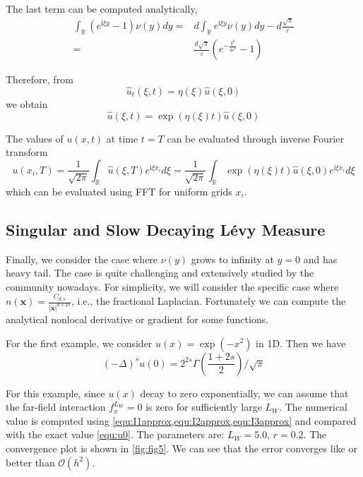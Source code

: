 \documentclass[10pt,a4paper]{article}
\newcommand{\ii}[0]{\mathrm{i}}
\newcommand{\RR}[0]{\mathbb{R}}
\newcommand{\bx}[0]{\mathbf{x}}
\theoremstyle{definition}
\begin{document}
The last term can be computed analytically,
\begin{align}
	\int_{\RR} {({e^{\ii\xi y}} - 1)} \nu (y)dy =& d\int_{\RR} {{e^{\ii\xi y}}\nu (y)} dy - d\frac{{\sqrt \pi  }}{\varepsilon }\\
	 =&\frac{{ d\sqrt \pi  }}{\varepsilon }\left( {{e^{ - \frac{{{\xi ^2}}}{{4{\varepsilon ^2}}}}} - 1} \right)
\end{align}

Therefore, from 
\begin{equation}
	\hat u_t(\xi, t) = \eta(\xi) \hat u(\xi, 0)
\end{equation}
we obtain
\begin{equation}
	\hat u(\xi, t) = \exp(\eta(\xi)t)\hat u(\xi, 0)
\end{equation}

The values of $u(x,t)$ at time $t=T$ can be evaluated through inverse Fourier transform
\begin{equation}
	u(x_i, T) = \frac{1}{\sqrt{2\pi}}\int_\RR \hat u(\xi, T) e^{\ii \xi x_i} d\xi  = \frac{1}{\sqrt{2\pi}}\int_\RR  \exp(\eta(\xi)t)\hat u(\xi, 0) e^{\ii \xi x_i} d\xi 
\end{equation}
which can be evaluated using FFT for uniform grids $x_i$. 

\subsection{Singular and Slow Decaying L\'evy Measure}

Finally, we consider the case where $\nu(y)$ grows to infinity at $y=0$ and has heavy tail. The case is quite challenging and extensively studied by the community nowadays. For simplicity, we will consider the specific case where $n(\bx) = \frac{C_{d, s}}{|\bx|^{d+2s}}$, i.e., the fractional Laplacian. Fortunately we can compute  the analytical nonlocal derivative or gradient for some functions. 

For the first example, we consider $u(x)=\exp(-x^2)$ in 1D. Then we have
\begin{equation}\label{equ:u0}
	(-\Delta)^s u(0) = 2^{2s}\Gamma\left( \frac{1+2s}{2} \right)/\sqrt{\pi}
\end{equation}

For this example, since $u(x)$ decay to zero exponentially, we can assume that the far-field interaction $f^{L_W}_x=0$ is zero for sufficiently large $L_W$. The numerical value is computed using \cref{equ:I1approx,equ:I2approx,equ:I3approx} and compared with the exact value \cref{equ:u0}. The parameters are: $L_W=5.0$, $r=0.2$. The convergence plot is shown in \cref{fig:fig5}. We can see that the error converges like or better than $\mathcal{O}(h^2)$. 
\end{document}
